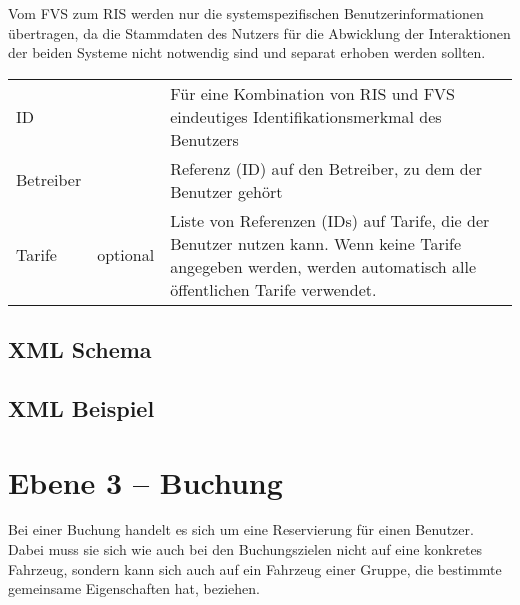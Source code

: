 Vom FVS zum RIS werden nur die systemspezifischen Benutzerinformationen übertragen, da die Stammdaten des Nutzers für die Abwicklung der Interaktionen der beiden Systeme nicht notwendig sind und separat erhoben werden sollten.

\begin{flushleft}
\begin{tabularx}{\linewidth}{l>{\raggedright\arraybackslash}l>{\raggedright\arraybackslash}X} 
\toprule
ID & & Für eine Kombination von RIS und FVS eindeutiges Identifikationsmerkmal des Benutzers \\
Betreiber & & Referenz (ID) auf den Betreiber, zu dem der Benutzer gehört \\
Tarife & optional & Liste von Referenzen (IDs) auf Tarife, die der Benutzer nutzen kann. Wenn keine Tarife angegeben werden, werden automatisch alle öffentlichen Tarife verwendet. \\
\bottomrule
\end{tabularx}
\end{flushleft}

\subsection{XML Schema}


\subsection{XML Beispiel}

\section{Ebene 3 -- Buchung}
Bei einer Buchung handelt es sich um eine Reservierung für einen Benutzer. Dabei muss sie sich wie auch bei den Buchungszielen nicht auf eine konkretes Fahrzeug, sondern kann sich auch auf ein Fahrzeug einer Gruppe, die bestimmte gemeinsame Eigenschaften hat, beziehen.

